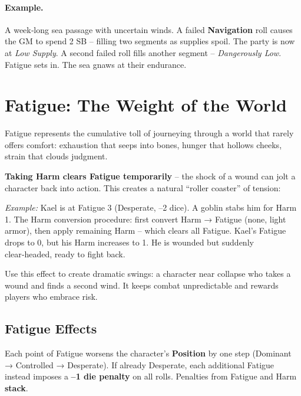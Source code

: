 \paragraph{Example.}
A week‑long sea passage with uncertain winds. A failed \textbf{Navigation} roll causes the GM to spend 2 SB – filling two segments as supplies spoil. The party is now at \textit{Low Supply}. A second failed roll fills another segment – \textit{Dangerously Low}. Fatigue sets in. The sea gnaws at their endurance.

\section{Fatigue: The Weight of the World}
\label{sec:fatigue-gm}

Fatigue represents the cumulative toll of journeying through a world that rarely offers comfort: exhaustion that seeps into bones, hunger that hollows cheeks, strain that clouds judgment.

\begin{tcolorbox}[colback=gray!5!white, colframe=gray!75!black, title={The Roller‑Coaster Effect}]
\textbf{Taking Harm clears Fatigue temporarily} – the shock of a wound can jolt a character back into action. This creates a natural “roller coaster” of tension:

\medskip
\noindent\textit{Example:} Kael is at Fatigue 3 (Desperate, –2 dice). A goblin stabs him for Harm 1. The Harm conversion procedure: first convert Harm → Fatigue (none, light armor), then apply remaining Harm – which clears all Fatigue. Kael’s Fatigue drops to 0, but his Harm increases to 1. He is wounded but suddenly clear‑headed, ready to fight back.

\medskip
Use this effect to create dramatic swings: a character near collapse who takes a wound and finds a second wind. It keeps combat unpredictable and rewards players who embrace risk.
\end{tcolorbox}

\subsection{Fatigue Effects}
\label{subsec:fatigue-effects}

Each point of Fatigue worsens the character’s \textbf{Position} by one step (Dominant → Controlled → Desperate). If already Desperate, each additional Fatigue instead imposes a \textbf{–1 die penalty} on all rolls. Penalties from Fatigue and Harm \textbf{stack}.

